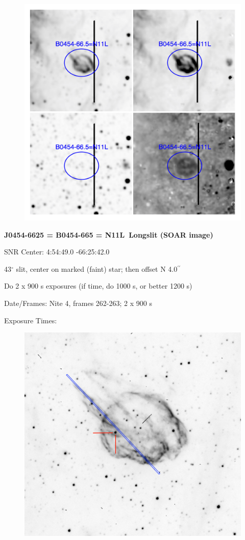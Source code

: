 \documentclass[11pt]{article}
\newcommand{\arcsec}{$^{\prime\prime}$}
\begin{document}
\begin{figure}
\includegraphics[width=12.5cm]{snapshots/N11L.png}
\end{figure}

\newpage
{\bf J0454-6625 = B0454-665 = N11L\ Longslit (SOAR image)}

SNR Center:   4:54:49.0   -66:25:42.0     

43$^\circ$ slit, center on marked (faint) star; then offset N 4.0\arcsec

Do 2 x 900 s exposures  (if time, do 1000 s, or better 1200 s)

Date/Frames:  Nite 4, frames 262-263;  2 x 900 s

Exposure Times:  

\begin{figure}
\includegraphics[width=12.5cm]{snapshots/N11L_longslit.png}
\end{figure}
\end{document}
